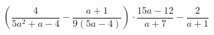 \begin{ex}[type=expression]
	\begin{condition}
		\( \left( \dfrac{4}{5a^2+a-4}-\dfrac{a+1}{9(5a-4)} \right) \cdot\dfrac{15a-12}{a+7}-\dfrac{2}{a+1}\)
	\end{condition}
\end{ex}
